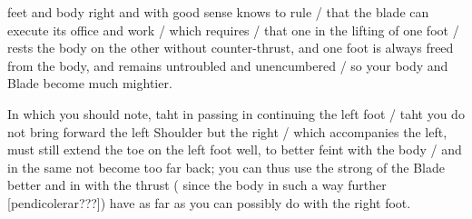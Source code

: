 \newpage


\newpage



feet and body right and with good sense knows to rule / that the 
blade can execute its office and work / which requires / that one in the
lifting of one foot / rests the body on the other without
counter-thrust, and one foot is
always freed from the body, and remains untroubled and unencumbered /
so your body and Blade become much mightier.


In which you should note, taht in passing in continuing the left foot
/ taht you do not bring forward the left Shoulder but the right /
which accompanies the left, must still extend the toe on the left foot
well, to better feint with the body / and in the same not become too
far back; you can thus use the strong of the Blade better and in with
the thrust ( since the body in such a way further [pendicolerar???])
have as far as you can possibly do with the right foot.

